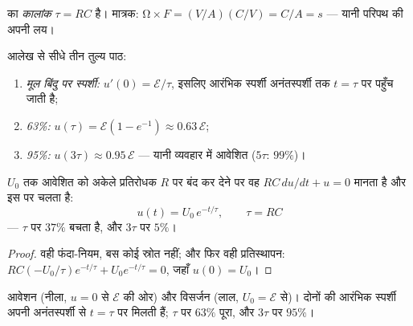 \begin{definition}[कालांक]\label{def:g12:rc-rl-circuits:tau}
 का \emph{कालांक} $\tau = RC$ है। मात्रक:
$\unit{\ohm} \times \unit{F} =
(\unit{V/A})(\unit{C/V}) = \unit{C/A} = \unit{s}$ --- यानी परिपथ की अपनी लय।
\end{definition}

\begin{method}[वक्र पर $\tau$ पढ़ना]\label{met:g12:rc-rl-circuits:reading}
आलेख से सीधे तीन तुल्य पाठ:
\begin{enumerate}
  \item \emph{मूल बिंदु पर स्पर्शी:} $u'(0) = \mathcal{E}/\tau$, इसलिए आरंभिक स्पर्शी
        अनंतस्पर्शी तक $t = \tau$ पर पहुँच जाती है;
  \item \emph{63\%:} $u(\tau) = \mathcal{E}(1 - e^{-1}) \approx
        0.63\,\mathcal{E}$;
  \item \emph{95\%:} $u(3\tau) \approx 0.95\,\mathcal{E}$ --- यानी व्यवहार में आवेशित ($5\tau$: $99\%$)।
\end{enumerate}
\end{method}

\begin{proposition}[विसर्जन]\label{prop:g12:rc-rl-circuits:discharge}
$U_0$ तक आवेशित  को अकेले प्रतिरोधक $R$ पर बंद कर देने पर
वह $RC\,du/dt + u = 0$ मानता है और इस पर चलता है:
\[
u(t) = U_0\,e^{-t/\tau}, \qquad \tau = RC
\]
--- $\tau$ पर $37\%$ बचता है, और $3\tau$ पर $5\%$।
\end{proposition}

\begin{proof}
वही फंदा-नियम, बस कोई स्रोत नहीं; और फिर वही प्रतिस्थापन: $RC(-U_0/\tau)e^{-t/\tau} + U_0 e^{-t/\tau} = 0$, जहाँ $u(0) = U_0$।
\end{proof}

\begin{omfigure}

{\small आवेशन (नीला, $u = 0$ से $\mathcal{E}$ की ओर) और विसर्जन (लाल, $U_0 = \mathcal{E}$ से)।
दोनों की आरंभिक स्पर्शी अपनी अनंतस्पर्शी से $t = \tau$ पर मिलती हैं; $\tau$ पर
$63\%$ पूरा, और $3\tau$ पर $95\%$।}
\end{omfigure}

